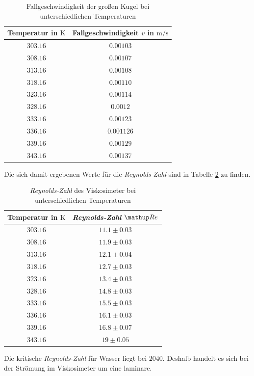 \begin{table}
\centering
\begin{tabular} {cc}
  \toprule
  Temperatur in $\si{\kelvin}$ & Fallgeschwindigkeit $v$ in $\si{\meter\per\second}$ \\
  \midrule
  $\num{303.16}$ & $\num{0.00103}$ \\
  $\num{308.16}$ & $\num{0.00107}$ \\
  $\num{313.16}$ & $\num{0.00108}$ \\
  $\num{318.16}$ & $\num{0.00110}$ \\
  $\num{323.16}$ & $\num{0.00114}$ \\
  $\num{328.16}$ & $\num{0.0012}$ \\
  $\num{333.16}$ & $\num{0.00123}$ \\
  $\num{336.16}$ & $\num{0.001126}$ \\
  $\num{339.16}$ & $\num{0.00129}$ \\
  $\num{343.16}$ & $\num{0.00137}$ \\
\bottomrule
\end{tabular}
\caption{Fallgeschwindigkeit der großen Kugel bei unterschiedlichen Temperaturen}
\label{tab:fall_kugel}
\end{table}

Die sich damit ergebenen Werte für die \emph{Reynolds-Zahl} sind in Tabelle \ref{tab:rey_visko} %
zu finden.

\begin{table}
\centering
\begin{tabular} {cc}
  \toprule
  Temperatur in $\si{\kelvin}$ & \emph{Reynolds-Zahl} $\map{Re}$ \\
  \midrule
  $\num{303.16}$ & $\num{11.1}\pm \num{0.03}$ \\
  $\num{308.16}$ & $\num{11.9}\pm \num{0.03}$ \\
  $\num{313.16}$ & $\num{12.1}\pm \num{0.04}$ \\
  $\num{318.16}$ & $\num{12.7}\pm \num{0.03}$ \\
  $\num{323.16}$ & $\num{13.4}\pm \num{0.03}$ \\
  $\num{328.16}$ & $\num{14.8}\pm \num{0.03}$ \\
  $\num{333.16}$ & $\num{15.5}\pm \num{0.03}$ \\
  $\num{336.16}$ & $\num{16.1}\pm \num{0.03}$ \\
  $\num{339.16}$ & $\num{16.8}\pm \num{0.07}$ \\
  $\num{343.16}$ & $\num{19}\pm \num{0.05}$ \\
\bottomrule
\end{tabular}
\caption{\emph{Reynolds-Zahl} des Viskosimeter bei unterschiedlichen Temperaturen} %
\label{tab:rey_visko}
\end{table}
Die kritische \emph{Reynolds-Zahl} für Wasser liegt bei $2040$\cite{rey}. %
Deshalb handelt es sich bei der Strömung im Viskosimeter um eine laminare.
